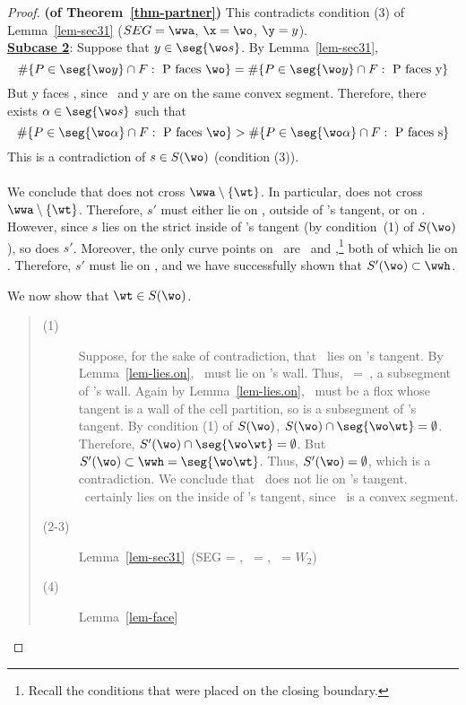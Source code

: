 \begin{proof}{\bf (of Theorem~\ref{thm-partner})  }
This contradicts condition (3) of Lemma~\ref{lem-sec31} 
($SEG = \wwa$, $\x = \wo$, $\y = y$).\\
%
\underline{{\bf Subcase 2}}: Suppose that $y \in \seg{\wo s}$.
By Lemma~\ref{lem-sec31},
\[ \#\{P \in \seg{\wo y} \cap F: \mbox{ P faces \wo}\} = 
\#\{P \in \seg{\wo y} \cap F: \mbox{ P faces y}\} \]
But y faces \wo, since \wo\ and y are on the same convex segment.
Therefore, there exists $\alpha \in \seg{\wo s}$ such that
\[ \#\{P \in \seg{\wo\alpha} \cap F: \mbox{ P faces \wo}\} 
> \#\{P \in \seg{\wo\alpha} \cap F: \mbox{ P faces s}\} \]
This is a contradiction of $s \in S(\wo)$ (condition (3)).\\
\hspace*{4in}{\bf QED of Claim}\\
We conclude that  does not cross $\wwa \setminus \{\wt\}$.
In particular,  does not cross $\wwa \setminus \{\wt\}$.
Therefore, $s'$ must either lie on \wwa, outside of \wo's tangent, or on \wwh.
However, since $s$ lies on the strict inside of \wo's tangent (by 
condition~(1) of $S(\wo)$), so does $s'$.
Moreover, the only curve points on \wwa\ are \wo\ and \wt,\footnote{Recall
the conditions that were placed on the closing boundary.}
both of which lie on \wwh.
Therefore, $s'$ must lie on \wwh, and we have successfully shown that
$S'(\wo) \subset \wwh$.

We now show that $\wt \in S(\wo)$.
\begin{quote}
\begin{description}
   \item[(1)] Suppose, for the sake of contradiction, that \wt\ lies on \wo's tangent.
By Lemma~\ref{lem-lies.on}, \wt\ must lie on \wo's wall.
Thus, \mbox{\wwh\ = \seg{\wo\wt}}, a subsegment of \wo's wall.
Again by Lemma~\ref{lem-lies.on}, \wo\ must be a flox whose tangent is a wall
of the cell partition, so \seg{\wo\wt} is a subsegment of \wo's tangent.
By condition (1) of $S(\wo)$,
\mbox{$S(\wo) \cap \seg{\wo\wt} = \emptyset$}.
Therefore, \mbox{$S'(\wo) \cap \seg{\wo\wt} = \emptyset$}.
But $S'(\wo) \subset \wwh = \seg{\wo\wt}$.
Thus, $S'(\wo) = \emptyset$, which is a contradiction.
We conclude that \wt\ does not lie on \wo's tangent.
\wt\ certainly lies on the inside of \wo's tangent, since
\wwa\ is a convex segment.
   \item[(2-3)] Lemma~\ref{lem-sec31}\ (SEG = \wwa, \x\ = \wo, \y\ = $W_{2}$)
   \item[(4)] Lemma~\ref{lem-face}
\end{description}
\end{quote}


\end{proof}
